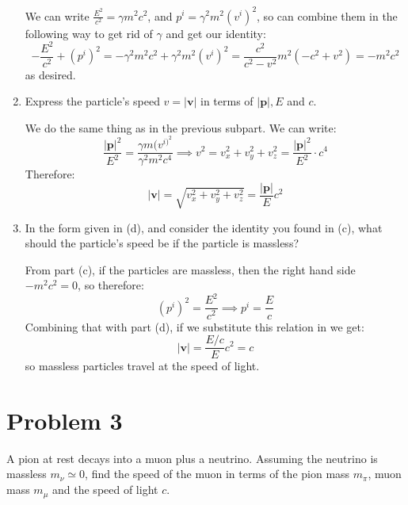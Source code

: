 \documentclass[10pt]{article}
\begin{document}
\begin{enumerate}[label=(\alph*)]
			\begin{solution}
				We can write \( \frac{E^2}{c^2} = \gamma m^2 c^2 \), and \( p^{i} = \gamma^2 m^2 (v^{i})^2 \),
				so can combine them in the following way to get rid of \( \gamma \) and get our identity:
				\[
					-\frac{E^2}{c^2} + (p^{i})^2 = -\gamma^2 m^2 c^2 + \gamma^2 m^2 (v^{i})^2 =
					\frac{c^2}{c^2 - v^2} m^2(-c^2 + v^2) = -m^2c^2
				\]
				as desired. 
			\end{solution}
		\item Express the particle's speed \( v = |\mathbf{v}| \) in terms of \( |\mathbf{p}|, E \) and \( c \). 

			\begin{solution}
				We do the same thing as in the previous subpart. We can write:
				\[
					\frac{|\mathbf{p}|^2}{E^2} = \frac{\gamma m (v^{i)^2}}{\gamma^2 m^2 c^{4}} \implies v^2 =
					v_x^2 + v_y^2 + v_z^2 = \frac{|\mathbf{p}|^2}{E^2} \cdot c^{4}
				\]
				Therefore:
				\[
					|\mathbf{v}| = \sqrt{v_x^2 + v_y^2 + v_z^2} = \frac{|\mathbf{p}|}{E} c^2
				\]
			\end{solution}
		\item In the form given in (d), and consider the identity you found in (c), what should the
			particle's speed be if the particle is massless? 

			\begin{solution}
				From part (c), if the particles are massless, then the right hand side \( -m^2 c^2 = 0 \), so
				therefore:
				\[
					(p^{i})^2 = \frac{E^2}{c^2} \implies p^{i} = \frac{E}{c}
				\]
				Combining that with part (d), if we substitute this relation in we get:
				\[
					|\mathbf{v}| = \frac{E / c}{E} c^2 = c
				\]
				so massless particles travel at the speed of light. 
			\end{solution}
	\end{enumerate}
	\pagebreak
	\section*{Problem 3}
	A pion at rest decays into a muon plus a neutrino. Assuming the neutrino is massless \( m_\nu \simeq 0
	\), find the speed of the muon in terms of the pion mass \( m_{\pi} \), muon mass \( m_\mu \) and the
	speed of light \( c \). 
\end{document}
